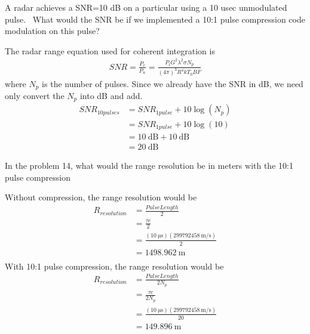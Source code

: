 \documentclass[12pt]{article}
\newenvironment{exercise}[2][Exercise]{\begin{trivlist}
    \item[\hskip \labelsep {\bfseries #1}\hskip \labelsep {\bfseries #2.}]}{\end{trivlist}}
\begin{document}
      \begin{exercise}{14}
      A radar achieves a SNR=10 dB on a particular using a 10 usec unmodulated pulse.  What would the SNR be if we implemented a 10:1 pulse compression code modulation on this pulse?  
      
      The radar range equation used for coherent integration is
      \begin{align*}
      SNR = \frac{P_{r}}{P_{n}} = \frac{ P_{t} G^{2} \lambda^{2} \sigma N_{p} }{ (4\pi)^{3} R^{4} k T_{0} B F }
      \end{align*}
      where $N_{p}$ is the number of pulses.  Since we already have the SNR in dB, we need only convert the $N_{p}$ into dB and add.
      \begin{align*}
      SNR_{10 pulses} &= SNR_{1 pulse} + 10 \log{(N_{p})}\\
       & = SNR_{1 pulse} + 10 \log{(10)}\\
       & = \SI{10}{\dB} + \SI{10}{\dB}\\
       & = \SI{20}{\dB}
      \end{align*}
      \end{exercise}
      
      \begin{exercise}{15}
      In the problem 14, what would the range resolution be in meters with the 10:1 pulse compression      

      Without compression, the range resolution would be
      \begin{align*}
      R_{resolution} & = \frac{PulseLength}{2}\\
      & = \frac{ \tau c }{2}\\
      & = \frac{ (\SI{10}{\us}) (\SI{299792458}{\meter\per\second}) }{2}\\
      & = \SI{1498.962}{\meter}\\
      \end{align*}
      With 10:1 pulse compression, the range resolution would be
      \begin{align*}
      R_{resolution} & = \frac{PulseLength}{2 N_{p}}\\
      & = \frac{  \tau c }{2 N_{p}}\\
      & = \frac{ (\SI{10}{\us}) (\SI{299792458}{\meter\per\second}) }{20}\\
      & = \SI{149.896}{\meter}\\
      \end{align*}
      \end{exercise}

       
       
\end{document}
